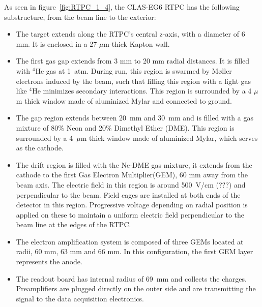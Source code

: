 \documentclass[twocolumn,showpacs,superscriptaddress,groupedaddress]{revtex4}
\begin{document}
As seen in figure~\ref{fig:RTPC_1_4}, the CLAS-EG6 RTPC has the following 
substructure, from the beam line to the exterior:\\
\begin{itemize}
   \item The target extends along the RTPC's central z-axis, with a diameter of 
      6 mm. It is enclosed in a 27-$\mu$m-thick Kapton wall.

   \item The first gas gap extends from 3 mm to 20 mm radial distances. It is 
      filled with $^{4}$He gas at 1~atm. During run, this region is swarmed by 
      M\o ller electrons induced by the beam, such that filling this region 
      with a light gas like $^{4}$He minimizes secondary interactions. This 
      region is surrounded by a 4 $\mu$m thick window made of aluminized Mylar 
      and connected to ground.                                                                
   \item The gap region extends between 20~mm and 30~mm and is filled with a 
      gas mixture of 80$\%$ Neon and 20$\%$ Dimethyl Ether (DME). This region 
      is surrounded by a 4~$\mu$m thick window made of aluminized Mylar, which 
      serves as the cathode.

   \item The drift region is filled with the Ne-DME gas mixture, it extends 
      from the cathode to the first Gas Electron Multiplier(GEM), 60 mm away 
      from the beam axis. The electric field in this region is around 500~V/cm 
      (???) and perpendicular to the beam. Field cages are installed at both 
      ends of the detector in this region. Progressive voltage depending on 
      radial position is applied on these to maintain a uniform electric field 
      perpendicular to the beam line at the edges of the RTPC.
   
   \item The electron amplification system is composed of three GEMs located at 
      radii, 60 mm, 63 mm and 66 mm. In this configuration, the first GEM layer 
      represents the anode.

   \item The readout board has internal radius of 69~mm and collects the 
      charges. Preamplifiers are plugged directly on the outer side and are 
      transmitting the signal to the data acquisition electronics.
\end{itemize}
\end{document}
